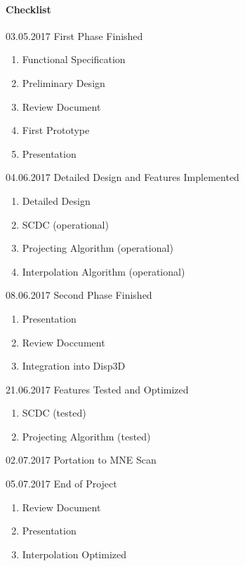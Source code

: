 \paragraph{Checklist}
\begin{aims}
	\item[03.05.2017]First Phase Finished
	\begin{enumerate}\itemsep0pt 
		\item Functional Specification
		\item Preliminary Design
		\item Review Document
		\item First Prototype
		\item Presentation
	\end{enumerate}
	
	\item[04.06.2017]Detailed Design and Features Implemented
	\begin{enumerate}\itemsep0pt
		\item Detailed Design
		\item SCDC (operational)
		\item Projecting Algorithm (operational)
		\item Interpolation Algorithm (operational)
	\end{enumerate}
	
	\item[08.06.2017]Second Phase Finished
	\begin{enumerate}\itemsep0pt
		\item Presentation
		\item Review Doccument
		\item Integration into Disp3D
	\end{enumerate}

	\item[21.06.2017]Features Tested and Optimized
	\begin{enumerate}\itemsep0pt
		\item SCDC (tested)
		\item Projecting Algorithm (tested)
	\end{enumerate}
	
	\item[02.07.2017]Portation to MNE Scan
	
	\item[05.07.2017]End of Project
	\begin{enumerate}\itemsep0pt
		\item Review Document
		\item Presentation
		\item Interpolation Optimized
	\end{enumerate}


\end{aims}

